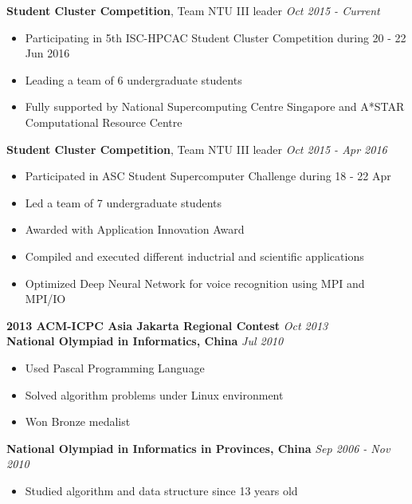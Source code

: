 \documentclass[a4paper, 12pt]{article}
\newenvironment{changemargin}[2]{%
  \begin{list}{}{%
      \setlength{\topsep}{0pt}%
      \setlength{\leftmargin}{#1}%
      \setlength{\rightmargin}{#2}%
      \setlength{\listparindent}{\parindent}%
      \setlength{\itemindent}{\parindent}%
      \setlength{\parsep}{\parskip}%
    }%
  \item[]}{\end{list}
}
\newenvironment{body}
{
\vspace*{-16pt}
\begin{changemargin}{-0.25in}{-0.5in}
}
{
\end{changemargin}
}
\begin{document}
\begin{body}
  \vspace{14pt}

  \textbf{Student Cluster Competition}, {Team NTU III leader} \hfill \emph{Oct 2015 - Current}\\
  \vspace*{-6pt}
  \begin{itemize} \itemsep -0pt  \small
  \item Participating in 5th ISC-HPCAC Student Cluster Competition during 20 - 22 Jun 2016
  \item Leading a team of 6 undergraduate students
  \item Fully supported by National Supercomputing Centre Singapore and A*STAR Computational Resource Centre
  \end{itemize}

  \textbf{Student Cluster Competition}, {Team NTU III leader} \hfill \emph{Oct 2015 - Apr 2016}\\
  \vspace*{-6pt}
  \begin{itemize} \itemsep -0pt  \small
  \item Participated in ASC Student Supercomputer Challenge during 18 - 22 Apr
  \item Led a team of 7 undergraduate students
  \item Awarded with Application Innovation Award
  \item Compiled and executed different inductrial and scientific applications
  \item Optimized Deep Neural Network for voice recognition using MPI and MPI/IO
  \end{itemize}

  \textbf{2013 ACM-ICPC Asia Jakarta Regional Contest} \hfill \emph{Oct 2013}\\

  \textbf{National Olympiad in Informatics, China} \hfill \emph{Jul 2010}\\
  \vspace*{-6pt}
  \begin{itemize} \itemsep -0pt \small
  \item Used Pascal Programming Language
  \item Solved algorithm problems under Linux environment
  \item Won Bronze medalist
  \end{itemize}

  \textbf{National Olympiad in Informatics in Provinces, China} \hfill \emph{Sep 2006 - Nov 2010}\\
  \vspace*{-6pt}
  \begin{itemize} \itemsep -0pt \small
  \item Studied algorithm and data structure since 13 years old
  \end{itemize}
\end{body}
\end{document}
